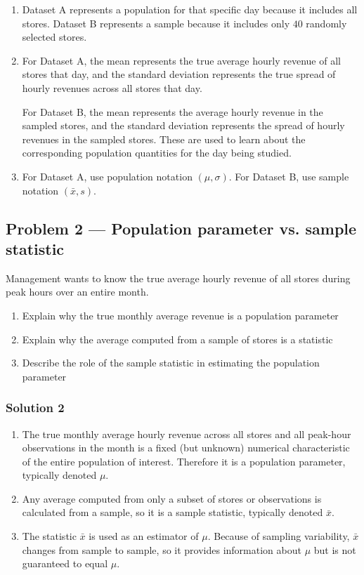 \begin{enumerate}
	\item Dataset A represents a population for that specific day because it includes all stores. Dataset B represents a sample because it includes only $40$ randomly selected stores.
	\item For Dataset A, the mean represents the true average hourly revenue of all stores that day, and the standard deviation represents the true spread of hourly revenues across all stores that day.
	
	For Dataset B, the mean represents the average hourly revenue in the sampled stores, and the standard deviation represents the spread of hourly revenues in the sampled stores. These are used to learn about the corresponding population quantities for the day being studied.
	\item For Dataset A, use population notation $(\mu,\sigma)$. For Dataset B, use sample notation $(\bar{x}, s)$.
\end{enumerate}


\subsection*{Problem 2 — Population parameter vs. sample statistic}

Management wants to know the true average hourly revenue of all stores during peak hours over an entire month.

\begin{enumerate}
	\item Explain why the true monthly average revenue is a population parameter
	\item Explain why the average computed from a sample of stores is a statistic
	\item Describe the role of the sample statistic in estimating the population parameter
\end{enumerate}

\subsubsection*{Solution 2}

\begin{enumerate}
	\item The true monthly average hourly revenue across all stores and all peak-hour observations in the month is a fixed (but unknown) numerical characteristic of the entire population of interest. Therefore it is a population parameter, typically denoted $\mu$.
	\item Any average computed from only a subset of stores or observations is calculated from a sample, so it is a sample statistic, typically denoted $\bar{x}$.
	\item The statistic $\bar{x}$ is used as an estimator of $\mu$. Because of sampling variability, $\bar{x}$ changes from sample to sample, so it provides information about $\mu$ but is not guaranteed to equal $\mu$.
\end{enumerate}

